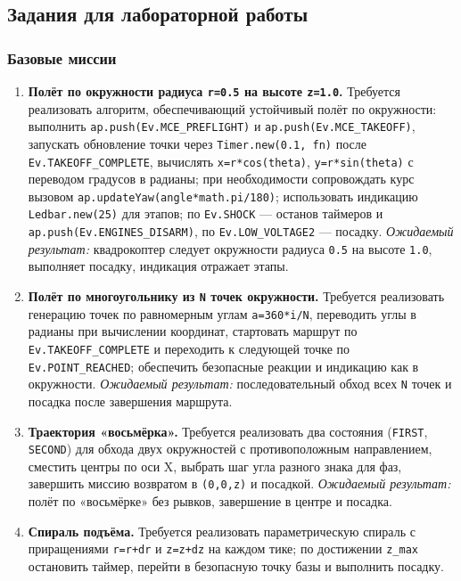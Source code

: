 \subsection{Задания для лабораторной работы}
\subsubsection{Базовые миссии}
\begin{enumerate}
  \item \textbf{Полёт по окружности радиуса \texttt{r=0.5} на высоте \texttt{z=1.0}.}
    Требуется реализовать алгоритм, обеспечивающий устойчивый полёт по окружности: выполнить \texttt{ap.push(Ev.MCE\_PREFLIGHT)} и \texttt{ap.push(Ev.MCE\_TAKEOFF)}, запускать обновление точки через \texttt{Timer.new(0.1, fn)} после \texttt{Ev.TAKEOFF\_COMPLETE}, вычислять \texttt{x=r*cos(theta)}, \texttt{y=r*sin(theta)} с переводом градусов в радианы; при необходимости сопровождать курс вызовом \texttt{ap.updateYaw(angle*math.pi/180)}; использовать индикацию \texttt{Ledbar.new(25)} для этапов; по \texttt{Ev.SHOCK} — останов таймеров и \texttt{ap.push(Ev.ENGINES\_DISARM)}, по \texttt{Ev.LOW\_VOLTAGE2} — посадку.
    \textit{Ожидаемый результат:} квадрокоптер следует окружности радиуса \texttt{0.5} на высоте \texttt{1.0}, выполняет посадку, индикация отражает этапы.
  \item \textbf{Полёт по многоугольнику из \texttt{N} точек окружности.}
    Требуется реализовать генерацию точек по равномерным углам \texttt{a=360*i/N}, переводить углы в радианы при вычислении координат, стартовать маршрут по \texttt{Ev.TAKEOFF\_COMPLETE} и переходить к следующей точке по \texttt{Ev.POINT\_REACHED}; обеспечить безопасные реакции и индикацию как в окружности.
    \textit{Ожидаемый результат:} последовательный обход всех \texttt{N} точек и посадка после завершения маршрута.
  \item \textbf{Траектория «восьмёрка».}
    Требуется реализовать два состояния (\texttt{FIRST}, \texttt{SECOND}) для обхода двух окружностей с противоположным направлением, сместить центры по оси X, выбрать шаг угла разного знака для фаз, завершить миссию возвратом в \texttt{(0,0,z)} и посадкой.
    \textit{Ожидаемый результат:} полёт по «восьмёрке» без рывков, завершение в центре и посадка.
  \item \textbf{Спираль подъёма.}
    Требуется реализовать параметрическую спираль с приращениями \texttt{r=r+dr} и \texttt{z=z+dz} на каждом тике; по достижении \texttt{z\_max} остановить таймер, перейти в безопасную точку базы и выполнить посадку.

\end{enumerate}
